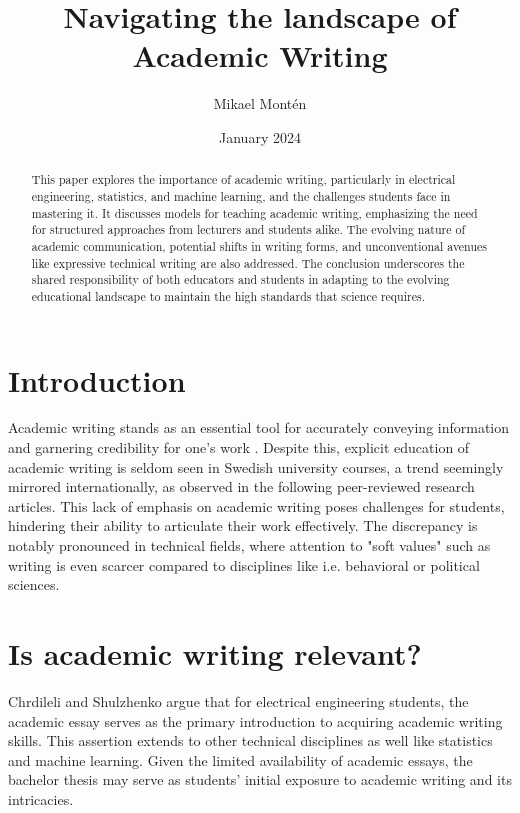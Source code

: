 \documentclass[a4paper,12pt]{article}
\title{Navigating the landscape of Academic Writing}
\author{Mikael Montén}
\date{January 2024}
\begin{document}
\maketitle

\begin{abstract}
This paper explores the importance of academic writing, particularly in electrical engineering, statistics, and machine learning, and the challenges students face in mastering it. It discusses models for teaching academic writing, emphasizing the need for structured approaches from lecturers and students alike. The evolving nature of academic communication, potential shifts in writing forms, and unconventional avenues like expressive technical writing are also addressed. The conclusion underscores the shared responsibility of both educators and students in adapting to the evolving educational landscape to maintain the high standards that science requires.
\end{abstract}


\section{Introduction}

Academic writing stands as an essential tool for accurately conveying information and garnering credibility for one's work \cite{Source2}. Despite this, explicit education of academic writing is seldom seen in Swedish university courses, a trend seemingly mirrored internationally, as observed in the following peer-reviewed research articles. This lack of emphasis on academic writing poses challenges for students, hindering their ability to articulate their work effectively. The discrepancy is notably pronounced in technical fields, where attention to "soft values" such as writing is even scarcer compared to disciplines like i.e. behavioral or political sciences.

\section{Is academic writing relevant?}

Chrdileli and Shulzhenko \cite{Source2} argue that for electrical engineering students, the academic essay serves as the primary introduction to acquiring academic writing skills. This assertion extends to other technical disciplines as well like statistics and machine learning. Given the limited availability of academic essays, the bachelor thesis may serve as students' initial exposure to academic writing and its intricacies.
\end{document}
